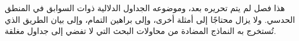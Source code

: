 \documentclass[../../../include/open-logic-chapter]{subfiles}
\begin{document}

\begin{editorial}
  هذا فصل لم يتم تحريره بعد، وموضوعه الجداول الدلالية ذوات السوابق في
  المنطق الحدسي. ولا يزال محتاجًا إلى أمثلة أخرى، وإلى براهين التمام،
  وإلى بيان الطريق الذي تُستخرج به النماذج المضادة من محاولات البحث التي
  لا تفضي إلى جداول مغلقة.
\end{editorial}


\OLEndChapterHook
\end{document}
